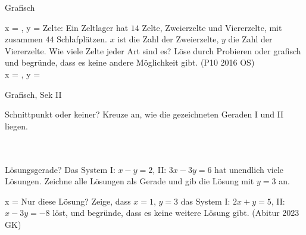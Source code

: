 \begin{aufgabe}{Grafisch}
\begin{teile}
x = \leerfeld , y = \leerfeld
\teil Zelte: Ein Zeltlager hat $14$ Zelte, Zweierzelte und Viererzelte, mit zusammen $44$ Schlafplätzen. $x$ ist die Zahl der Zweierzelte, $y$ die Zahl der Viererzelte. Wie viele Zelte jeder Art sind es? Löse durch Probieren oder grafisch und begründe, dass es keine andere Möglichkeit gibt. \hfill (P10 2016 OS) \\ x = \leerfeld , y = \leerfeld
\end{teile}
\end{aufgabe}

\begin{aufgabe}{Grafisch, Sek II}
\begin{teile}
\teil Schnittpunkt oder keiner? Kreuze an, wie die gezeichneten Geraden I und II liegen.\\ \\ \\ 

\begin{ksys}[xmin=-5,xmax=5,ymin=-5,ymax=5,ablesen]   \end{ksys}
\teil Lösungsgerade? Das System I: $x - y = 2$, II: $3x - 3y = 6$ hat unendlich viele Lösungen. Zeichne alle Lösungen als Gerade und gib die Lösung mit $y = 3$ an.

\begin{ksys}[xmin=-5,xmax=5,ymin=-5,ymax=5] \end{ksys}
x = \leerfeld
\teil Nur diese Lösung? Zeige, dass $x = 1$, $y = 3$ das System I: $2x + y = 5$, II: $x - 3y = -8$ löst, und begründe, dass es keine weitere Lösung gibt. \hfill (Abitur 2023 GK)
\end{teile}
\end{aufgabe}

